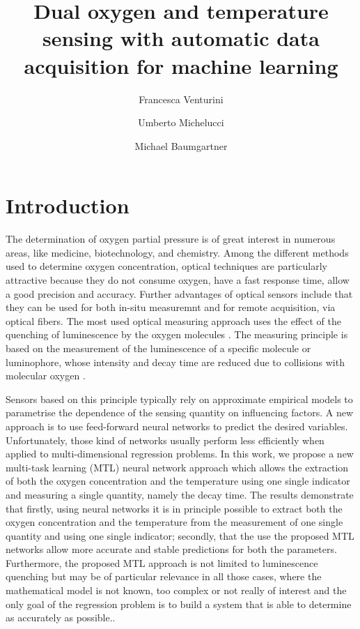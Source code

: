 \documentclass[9pt,twocolumn,twoside,pdftex]{optica}
\title{Dual oxygen and temperature sensing with automatic data acquisition for machine learning}
\author[1,2,*]{Francesca Venturini}
\author[2]{Umberto Michelucci}
\author[1]{Michael Baumgartner}
\affil[1]{Institute of Applied Mathematics and Physics, Zurich University of Applied Sciences,
Technikumstrasse 9, 8401 Winterthur, Switzerland}
\affil[2]{TOELT LLC; Birchlenstr. 25, 8600 Dübendorf, Switzerland}
\affil[*]{Corresponding author: francesca.venturini@zhaw.ch}
\begin{document}
\maketitle

\section{Introduction}

The determination of oxygen partial pressure is of great interest in numerous areas, like medicine, biotechnology, and chemistry. Among the different methods used to determine oxygen concentration, optical techniques are particularly attractive because they do not consume oxygen, have a fast response time, allow a good precision and accuracy. Further advantages of optical sensors include that they can be used for both in-situ measuremnt and for remote acquisition, via optical fibers. 
The most used optical measuring approach uses the effect of the quenching of luminescence by the oxygen molecules \cite{Wang2014}. The measuring principle is based on the measurement of the luminescence of a specific molecule or luminophore, whose intensity and decay time are reduced due to collisions with molecular oxygen \cite{Lakowicz2006}.

Sensors based on this principle typically rely on approximate empirical models to parametrise the dependence of the sensing quantity on influencing factors. A new approach is to use feed-forward neural networks to predict the desired variables. Unfortunately, those kind of networks usually perform less efficiently when applied to multi-dimensional regression problems. In this work, we propose a new multi-task learning (MTL) neural network approach which allows the extraction of both the oxygen concentration and the temperature using one single indicator and measuring a single quantity, namely the decay time. The results demonstrate that firstly, using neural networks it is in principle possible to extract both the oxygen concentration and the temperature from the measurement of one single quantity and using one single indicator; secondly, that the use the proposed MTL networks allow more accurate and stable predictions for both the parameters. Furthermore, the proposed MTL approach is not limited to luminescence quenching but may be of particular relevance in all those cases, where the mathematical model is not known, too complex or not really of interest and the only goal of the regression problem is to build a system that is able to determine as accurately as possible..
\end{document}
